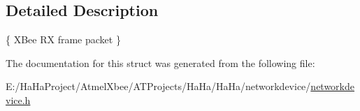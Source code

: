 \subsection{Detailed Description}
\{ X\+Bee RX frame packet \} 

The documentation for this struct was generated from the following file\+:\begin{DoxyCompactItemize}
\item 
E\+:/\+Ha\+Ha\+Project/\+Atmel\+Xbee/\+A\+T\+Projects/\+Ha\+Ha/\+Ha\+Ha/networkdevice/\hyperlink{networkdevice_8h}{networkdevice.\+h}\end{DoxyCompactItemize}
